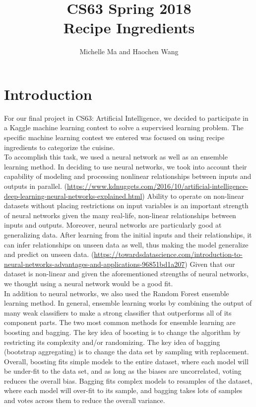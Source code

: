 \documentclass[11pt]{article}
\title{CS63 Spring 2018\\Recipe Ingredients}
\author{Michelle Ma and Haochen Wang}
\date{}
\begin{document}
\maketitle

\section{Introduction}

For our final project in CS63: Artificial Intelligence, we decided to participate
in a Kaggle machine learning contest to solve a supervised learning problem. The
specific machine learning contest we entered was focused on using recipe ingredients
to categorize the cuisine. \\

To accomplish this task, we used a neural network as well as
an ensemble learning method. In deciding to use neural networks, we took into
account their capability of modeling and processing nonlinear relationships between
inputs and outputs in parallel.
(\url{https://www.kdnuggets.com/2016/10/artificial-intelligence-deep-learning-neural-networks-explained.html})
Ability to operate on non-linear datasets without placing restrictions on input variables
is an important strength of neural networks
given the many real-life, non-linear relationships between inputs and outputs. Moreover,
neural networks are particularly good at generalizing data. After learning from
the initial inputs and their relationships, it can infer relationships on
unseen data as well, thus making the model generalize and predict on unseen data.
(\url{https://towardsdatascience.com/introduction-to-neural-networks-advantages-and-applications-96851bd1a207})
Given that our dataset is non-linear and given the aforementioned strengths of
neural networks, we thought using a neural network would be a good fit.\\

In addition to neural networks, we also used the Random Forest ensemble
learning method. In general, ensemble learning works by combining the output
of many weak classifiers to make a strong classifier that outperforms all of
its component parts. The two most common methods for ensemble learning are
boosting and bagging. The key idea of boosting is to change the algorithm
by restricting its complexity and/or randomizing. The key idea of bagging (bootstrap
aggregating) is to change the data set by sampling with replacement. Overall,
boosting fits simple models to the entire
dataset, where each model will be under-fit to the data set, and as long as
the biases are uncorrelated, voting reduces the overall bias. Bagging
fits complex models to resamples of the dataset, where each model will
over-fit to its sample, and bagging takes lots of samples and votes across them
to reduce the overall variance.  \\
\end{document}
